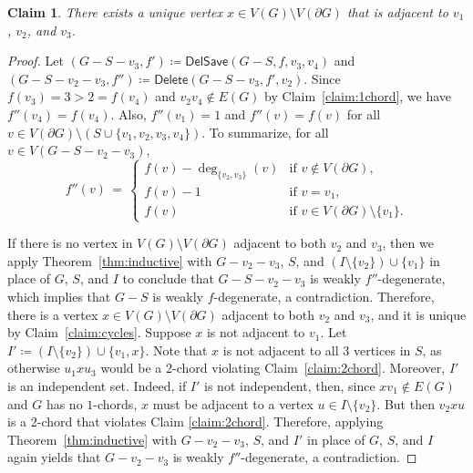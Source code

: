 \documentclass[11pt]{article}
\theoremstyle{slantthm}
\newtheorem{claim}{Claim}%
\numberwithin{equation}{section}
\theoremstyle{definition}
\newcommand{\defeq}{\coloneqq}
\numberwithin{equation}{section}
\newcommand{\0}{\varnothing}
\newcommand{\set}[1]{\{#1\}}
\newcommand{\del}{\mathsf{Delete}}
\newcommand{\delsave}{\mathsf{DelSave}}
\newcommand{\bdry}[1]{{\partial #1}}
\begin{document}
    \begin{claim}\label{claim:x}
        There exists a unique vertex $x \in V(G) \setminus V(\bdry{G})$ that is adjacent to $v_1$, $v_2$, and $v_3$.
    \end{claim}
    \begin{proof}
        Let $(G - S - v_3, f') \defeq \delsave(G-S, f, v_3,v_4)$ and $(G - S - v_2 - v_3,f'') \defeq \del(G -S - v_3, f', v_2)$. %
        Since $f(v_3) = 3 > 2 = f(v_4)$ and $v_2 v_4 \notin E(G)$ by Claim~\ref{claim:1chord}, we have $f''(v_4) = f(v_4)$. Also, $f''(v_1) = 1$ and $f''(v) = f(v)$ for all $v \in V(\bdry{G}) \setminus (S \cup \set{v_1, v_2, v_3, v_4})$. To summarize, for all $v \in V(G - S - v_2 - v_3)$,
        \[
        f''(v) \,=\, \begin{cases}
                    f(v) - \deg_{\set{v_2, v_3}}(v) &\text{if } v \notin V(\bdry{G}),\\
                    f(v) - 1 &\text{if } v = v_1,\\
                    f(v) &\text{if } v \in V(\bdry{G}) \setminus \set{v_1}.
                    \end{cases}
        \]
        
        If there is no vertex in $V(G) \setminus V(\bdry{G})$ adjacent to both $v_2$ and $v_3$, then we apply Theorem~\ref{thm:inductive} with $G - v_2 - v_3$, $S$, and $(I \setminus \set{v_2}) \cup \set{v_1}$ in place of $G$, $S$, and $I$ to conclude that $G - S - v_2 - v_3$ is weakly $f''$-degenerate, which implies that $G - S$ is weakly $f$-degenerate, a contradiction. %
        Therefore, there is a vertex $x \in V(G) \setminus V(\bdry{G})$ adjacent to both $v_2$ and $v_3$, and it is unique by Claim~\ref{claim:cycles}. Suppose $x$ is not adjacent to $v_1$. Let $I' \defeq (I \setminus \set{v_2}) \cup \{v_1, x\}$. Note that $x$ is not adjacent to all $3$ vertices in $S$, as otherwise $u_1xu_3$ would be a 2-chord violating Claim~\ref{claim:2chord}. Moreover, $I'$ is an independent set. Indeed, if $I'$ is not independent, then, since $xv_1 \notin E(G)$ and $G$ has no $1$-chords, $x$ must be adjacent to a vertex $u \in I \setminus \set{v_2}$. But then $v_2xu$ is a 2-chord that violates Claim \ref{claim:2chord}. Therefore, applying Theorem~\ref{thm:inductive} with $G - v_2 - v_3$, $S$, and $I'$ in place of $G$, $S$, and $I$ again yields that $G - v_2 - v_3$ is weakly $f''$-degenerate, a contradiction.
    \end{proof}
\end{document}
